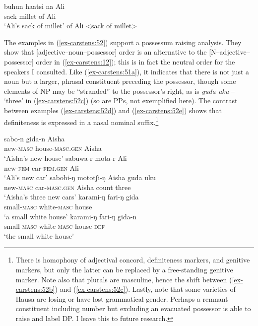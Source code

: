 \documentclass[output=paper
,modfonts
,nonflat]{langsci/langscibook}
\begin{document}
\begin{exe}
	\ex \label{ex-carstens:51}
	\xlist
	\ex \label{ex-carstens:51a}
	\gll buhun haatsi na Ali\\
	sack     millet  of Ali\\
	\glt `Ali's sack of millet'  	
	 of Ali <sack of millet> \label{ex-carstens:51b}
	
	\endxlist
\end{exe}
The examples in (\ref{ex-carstens:52}) support a possessum raising analysis. They show that [adjective--noun--possessor] order is an alternative to the [N--adjective--possessor] order in (\ref{ex-carstens:12}); this is in fact the neutral order for the speakers I consulted. Like (\ref{ex-carstens:51a}), it indicates that there is not just a noun but a larger, phrasal constituent preceding the possessor, though some elements of NP may be “stranded” to the possessor’s right, as is \textit{guda uku} – ‘three’ in (\ref{ex-carstens:52c}) (so are PPs, not exemplified here). The contrast between examples (\ref{ex-carstens:52d}) and (\ref{ex-carstens:52e}) shows that definiteness is expressed in a nasal nominal suffix.\footnote{There is homophony of adjectival concord, definiteness markers, and genitive markers, but only the latter can be replaced by a free-standing genitive marker. Note also that plurals are masculine, hence the shift between (\ref{ex-carstens:52b}) and (\ref{ex-carstens:52c}). Lastly, note that some varieties of Hausa are losing or have lost grammatical gender. Perhaps a remnant constituent including number but excluding an evacuated possessor is able to raise and label DP. I leave this to future research.}
\begin{exe}
	\ex \label{ex-carstens:52}
	\xlist
	\ex \label{ex-carstens:52a}
	\gll sabo-n        gida-n           Aisha\\
	new-\textsc{masc}  house-\textsc{masc.gen} Aisha\\
	\glt `Aisha's new house'  	
	\ex \label{ex-carstens:52b}
	\gll sabuwa-r     mota-r       Ali\\
	new-\textsc{fem}     car-\textsc{fem.gen} Ali\\
	\glt `Ali's new car'
	\ex \label{ex-carstens:52c}
	\gll sabobi-ŋ     mototʃi-ŋ       Aisha   guda     uku\\
	new-\textsc{masc}  car-\textsc{masc.gen}    Aisha        count     three\\
	\glt `Aisha's three new cars'  	
	\ex \label{ex-carstens:52d}
	\gll karami-ŋ   fari-ŋ       gida\\
	small-\textsc{masc}  white-\textsc{masc}   house\\
	\glt `a small white house'	
	\ex \label{ex-carstens:52e}
	\gll karami-ŋ     fari-ŋ         gida-n\\
	small-\textsc{masc}     white-\textsc{masc}  house-\textsc{def}\\
	\glt `the small white house'	
	\endxlist
\end{exe}
\end{document}
